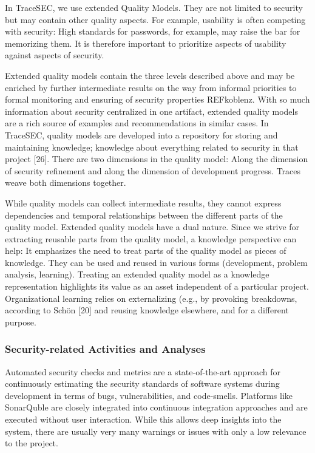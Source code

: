 In TraceSEC, we use extended Quality Models. They are not limited to security but may contain other quality aspects. For example, usability is often competing with security: High standards for passwords, for example, may raise the bar for memorizing them. It is therefore important to prioritize aspects of usability against aspects of security.

Extended quality models contain the three levels described above and may be enriched by further intermediate results on the way from informal priorities to formal monitoring and ensuring of security properties REFkoblenz. With so much information about security centralized in one artifact, extended quality models are a rich source of examples and recommendations in similar cases. In TraceSEC, quality models are developed into a repository for storing and maintaining knowledge; knowledge about everything related to security in that project [26]. There are two dimensions in the quality model: Along the dimension of security refinement and along the dimension of development progress. Traces weave both dimensions together.

While quality models can collect intermediate results, they cannot express dependencies and temporal relationships between the different parts of the quality model. Extended quality models have a dual nature. Since we strive for extracting reusable parts from the quality model, a knowledge perspective can help: It emphasizes the need to treat parts of the quality model as pieces of knowledge. They can be used and reused in various forms (development, problem analysis, learning). Treating an extended quality model as a knowledge representation highlights its value as an asset independent of a particular project. Organizational learning relies on externalizing (e.g., by provoking breakdowns, according to Schön [20] and reusing knowledge elsewhere, and for a different purpose. 

\vspace{-0.5em}
\subsubsection*{Security-related Activities and Analyses}
\vspace{-1em}
Automated security checks and metrics are a state-of-the-art approach for continuously estimating the security standards of software systems during development in terms of bugs, vulnerabilities, and code-smells. Platforms like SonarQuble are closely integrated into continuous integration approaches and are executed without user interaction. While this allows deep insights into the system, there are usually very many warnings or issues with only a low relevance to the project.

